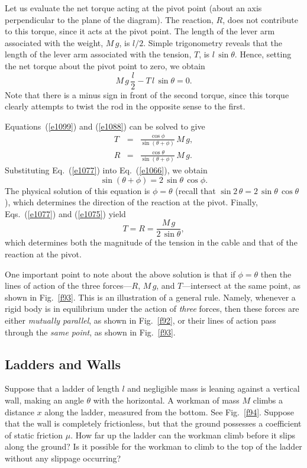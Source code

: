 Let us evaluate the net torque acting
at the pivot point (about an axis perpendicular to the plane of the diagram).
The reaction, $R$, does not contribute to this torque, since it acts at the pivot point. 
The length of the lever arm associated with the weight, $M\,g$,
is  $l/2$. 
Simple trigonometry reveals that the length of the  lever
arm associated with the tension, $T$, is $l\,\sin\theta$. Hence, setting the net
torque about the pivot point to zero, we obtain
\begin{equation}
M\,g\,\frac{l}{2} - T\,l\,\sin\theta = 0.\label{e1066}
\end{equation}
Note that there is a minus sign in front of the second torque, since this torque
clearly attempts to twist the rod in the opposite sense to the first.

Equations~(\ref{e1099}) and (\ref{e1088}) can be solved to give
\begin{eqnarray}
T &=& \frac{\cos\phi}{\sin(\theta+\phi)}\,M\,g,\label{e1077}\\[0.5ex]
R &=&  \frac{\cos\theta}{\sin(\theta+\phi)}\,M\,g.\label{e1075}
\end{eqnarray}
Substituting Eq.~(\ref{e1077}) into Eq.~(\ref{e1066}), we obtain
\begin{equation}
\sin(\theta+\phi) = 2\,\sin\theta\,\cos\phi.
\end{equation}
The physical solution of this equation is $\phi =\theta$ (recall that $\sin 2\,\theta
= 2\,\sin\theta\,\cos\theta$), which determines the direction of the reaction at
the pivot. Finally,  Eqs.~(\ref{e1077}) and (\ref{e1075}) yield
\begin{equation}
T = R = \frac{M\,g}{2\,\sin\theta},
\end{equation}
which determines both the magnitude of the tension in the cable and that of the reaction at the pivot.

One important point to note about the above solution is that if $\phi=\theta$
then the lines of action of the three forces---$R$, $M\,g$, and $T$---intersect at
the same point, as shown in Fig.~\ref{f93}. This is an illustration of a general
rule. Namely, whenever a rigid body is in equilibrium under the action of {\em three}
forces, then these forces are either {\em mutually parallel}, as shown in Fig.~\ref{f92},
or their lines of action pass through the {\em same point}, as shown in Fig.~\ref{f93}.

\subsection{Ladders and Walls}
Suppose that a ladder of length $l$ and negligible mass is leaning against a
vertical wall, making  an angle $\theta$ with the horizontal.
 A workman of mass $M$ climbs a distance $x$ along the ladder,
measured  from
the bottom. See Fig.~\ref{f94}.
 Suppose that the wall is completely frictionless, but  that the ground
possesses a coefficient of static friction $\mu$. How far up the ladder can the
workman climb before it slips along the ground? Is it possible for the workman to climb to
the top of the ladder without any slippage occurring?

